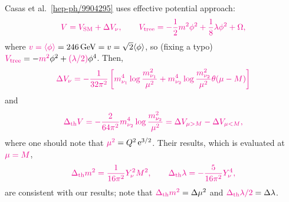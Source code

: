 \documentclass[a4paper,11pt]{scrartcl}
\numberwithin{equation}{section}
\newcommand\w[1]{_{\mathrm{#1}}}
\newcommand\ee{\mathop{}\!\mathrm{e}}
\newcommand\vev[1]{\langle#1\rangle}
\newcommand\unit[1]{\,\mathrm{#1}\xspace}
\newcommand\GeV{\unit{GeV}}
\newcommand{\C}{\color{magenta}}
\begin{document}
Casas et al.~\ref{hep-ph/9904295} uses effective potential approach:
\begin{align}
 \C
V=V\w{SM} + \Delta V_\nu,\qquad
V\w{tree}=-\frac12 m^2\phi^2+\frac18\lambda\phi^2+\Omega,
\end{align}
where ${\C v=\vev{\phi}}=246\GeV=v=\sqrt{2}\vev{\phi}$, so (fixing a typo)
$  {\C V\w{tree}}=-{\C m^2}\phi^2+{\C (\lambda/2)}\phi^4 $.
Then,
\begin{equation}\C
 \Delta V_{\nu}=-\frac{1}{32 \pi^{2}}\left[m_{\nu_{1}}^{4} \log \frac{m_{\nu_{1}}^{2}}{\mu^{2}}+
m_{\nu_{2}}^{4} \log \frac{m_{\nu_{2}}^{2}}{\mu^{2}}\theta(\mu-M) \right]
\end{equation}
and
\begin{equation}\C
 \Delta\w{th} V=-\frac{2}{64 \pi^{2}}m_{\nu_{2}}^{4} \log \frac{m_{\nu_{2}}^{2}}{\mu^{2}}=\Delta V_{\mu>M} - \Delta V_{\mu<M},
\end{equation}
where one should note that ${\C \mu^2}=Q^2\ee^{3/2}$.
Their results, which is evaluated at $\C\mu=M$,
\begin{equation}\C
 \Delta\w{th} m^{2}=\frac{1}{16 \pi^{2}} Y_{\nu}^{2} M^{2},
\qquad
\Delta\w{th} \lambda=-\frac{5}{16 \pi^{2}} Y_{\nu}^{4},
\end{equation}
are consistent with our results; note that
${\C\Delta\w{th}m^2} = \Delta\mu^2$ and ${\C\Delta\w{th}\lambda/2}=\Delta\lambda$.
\end{document}
